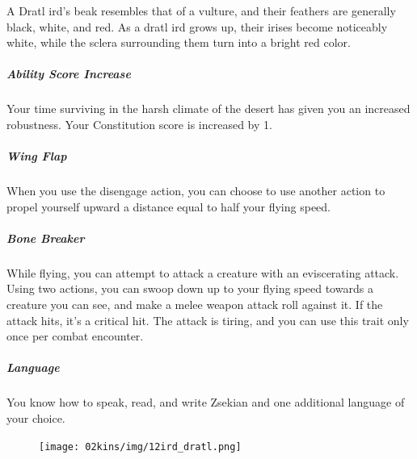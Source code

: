\begin{linenumbers}
A Dratl ird's beak resembles that of a vulture, and their feathers are generally black, white, and red.
As a dratl ird grows up, their irises become noticeably white, while the sclera surrounding them turn into a bright red color.

\subparagraph{Ability Score Increase} Your time surviving in the harsh climate of the desert has given you an increased robustness.
Your Constitution score is increased by 1.

\subparagraph{Wing Flap} When you use the disengage action, you can choose to use another action to propel yourself upward a distance equal to half your flying speed.

\subparagraph{Bone Breaker} While flying, you can attempt to attack a creature with an eviscerating attack.
Using two actions, you can swoop down up to your flying speed towards a creature you can see, and make a melee weapon attack roll against it.
If the attack hits, it's a critical hit.
The attack is tiring, and you can use this trait only once per combat encounter.

\subparagraph{Language} You know how to speak, read, and write Zsekian and one additional language of your choice.

\begin{figure}[!b]
    \centering
    \texttt{[image: 02kins/img/12ird\_dratl.png]}
\end{figure}
\end{linenumbers}

\newpage
